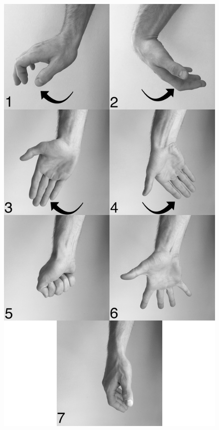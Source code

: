 \begin{figure}[H]                 
	\includegraphics[width=.6\textwidth]{figures/handGestures/BW/allHandMovementsVerticalBW}  
	\caption{}
	\label{fig:experiment_setup} 
\end{figure}

